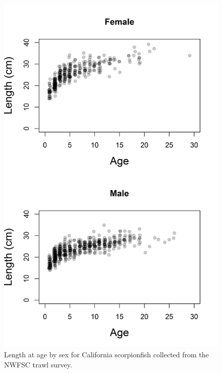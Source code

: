 \documentclass[12pt,]{article}
\begin{document}
\begin{figure}[htbp]
\centering
\includegraphics{Figures/Age_length_bySex.png}
\caption{Length at age by sex for California scorpionfish collected from
the NWFSC trawl survey. \label{fig:Agelength}}
\end{figure}
\end{document}
